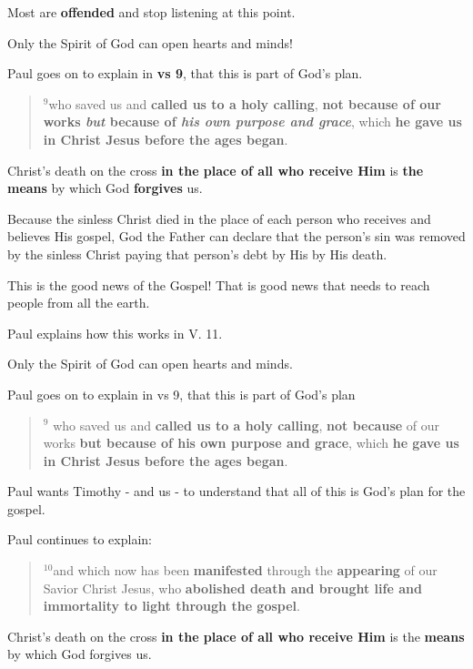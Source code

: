 \documentclass[12pt]{article} %
\newcommand{\superscript}[1]{\ensuremath{^{\textrm{#1}}}}
\begin{document}
Most are \textbf{offended} and stop listening at this point.

Only the Spirit of God can open hearts and minds!

Paul goes on to explain in \textbf{vs 9}, that this is part of God's plan.

\begin{quote}
\superscript{9}who saved us and \textbf{called us to a holy calling},
\textbf{not because of our works \emph{but}  because of \emph{his own purpose and grace}},
which \textbf{he gave us in Christ Jesus before the ages began}.
\end{quote}

Christ's death on the cross \textbf{in the place of all who receive Him}
is \textbf{the means} by which God \textbf{forgives} us.

Because the sinless Christ died in the place of each person who receives
and believes His gospel, God the Father can declare that the person's
sin was removed by the sinless Christ paying that person's debt by His
by His death.

This is the good news of the Gospel! That is good news that needs to reach
people from all the earth. 

Paul explains how this works in V. 11.

Only the Spirit of God can open hearts and minds.

Paul goes on to explain in vs 9, that this is part of God's plan

\begin{quote}
\superscript{9} who saved us and \textbf{called us to a holy calling},
\textbf{not because} of our works
\textbf{but because of his own purpose and grace},
which \textbf{he gave us in Christ Jesus before the ages began}.
\end{quote}

Paul wants Timothy - and us - to understand that all of this is God's
plan for the gospel.

Paul continues to explain:

\begin{quote}
\superscript{10}and which now has been 
\textbf{manifested} through the \textbf{appearing} of our Savior Christ Jesus,
who \textbf{abolished death and brought life and immortality to light through the gospel}.
\end{quote}

Christ's death on the cross \textbf{in the place of all who receive Him}  is
the \textbf{means} by which God forgives us.
\end{document}
